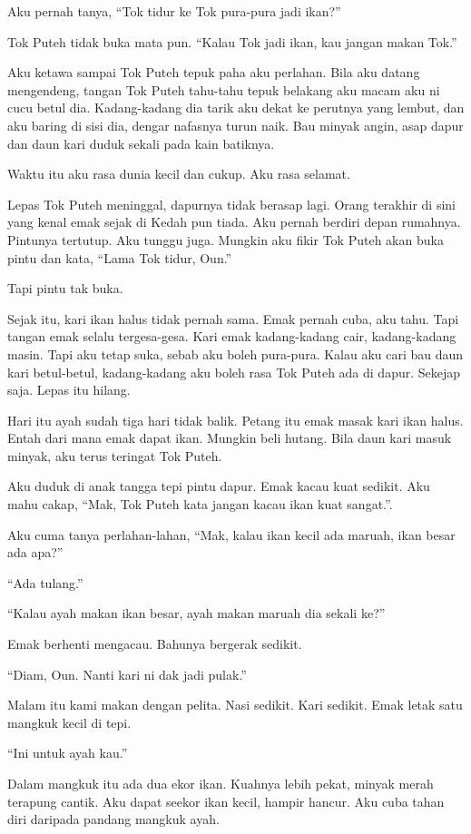 \documentclass[
  11pt,
  a5paper,
  openany,
  oneside]{book}
\begin{document}
Aku pernah tanya, ``Tok tidur ke Tok pura-pura jadi ikan?''

Tok Puteh tidak buka mata pun. ``Kalau Tok jadi ikan, kau jangan makan
Tok.''

Aku ketawa sampai Tok Puteh tepuk paha aku perlahan. Bila aku datang
mengendeng, tangan Tok Puteh tahu-tahu tepuk belakang aku macam aku ni
cucu betul dia. Kadang-kadang dia tarik aku dekat ke perutnya yang
lembut, dan aku baring di sisi dia, dengar nafasnya turun naik. Bau
minyak angin, asap dapur dan daun kari duduk sekali pada kain batiknya.

Waktu itu aku rasa dunia kecil dan cukup. Aku rasa selamat.

Lepas Tok Puteh meninggal, dapurnya tidak berasap lagi. Orang terakhir
di sini yang kenal emak sejak di Kedah pun tiada. Aku pernah berdiri
depan rumahnya. Pintunya tertutup. Aku tunggu juga. Mungkin aku fikir
Tok Puteh akan buka pintu dan kata, ``Lama Tok tidur, Oun.''

Tapi pintu tak buka.

Sejak itu, kari ikan halus tidak pernah sama. Emak pernah cuba, aku
tahu. Tapi tangan emak selalu tergesa-gesa. Kari emak kadang-kadang
cair, kadang-kadang masin. Tapi aku tetap suka, sebab aku boleh
pura-pura. Kalau aku cari bau daun kari betul-betul, kadang-kadang aku
boleh rasa Tok Puteh ada di dapur. Sekejap saja. Lepas itu hilang.

Hari itu ayah sudah tiga hari tidak balik. Petang itu emak masak kari
ikan halus. Entah dari mana emak dapat ikan. Mungkin beli hutang. Bila
daun kari masuk minyak, aku terus teringat Tok Puteh.

Aku duduk di anak tangga tepi pintu dapur. Emak kacau kuat sedikit. Aku
mahu cakap, ``Mak, Tok Puteh kata jangan kacau ikan kuat sangat.''.

Aku cuma tanya perlahan-lahan, ``Mak, kalau ikan kecil ada maruah, ikan
besar ada apa?''

``Ada tulang.''

``Kalau ayah makan ikan besar, ayah makan maruah dia sekali ke?''

Emak berhenti mengacau. Bahunya bergerak sedikit.

``Diam, Oun. Nanti kari ni dak jadi pulak.''

Malam itu kami makan dengan pelita. Nasi sedikit. Kari sedikit. Emak
letak satu mangkuk kecil di tepi.

``Ini untuk ayah kau.''

Dalam mangkuk itu ada dua ekor ikan. Kuahnya lebih pekat, minyak merah
terapung cantik. Aku dapat seekor ikan kecil, hampir hancur. Aku cuba
tahan diri daripada pandang mangkuk ayah.
\end{document}
